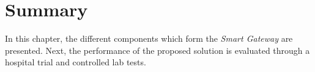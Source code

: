 \section{Summary}

In this chapter, the different components which form the \textit{Smart Gateway} are presented. 
Next, the performance of the proposed solution is evaluated through a hospital trial and controlled lab tests.